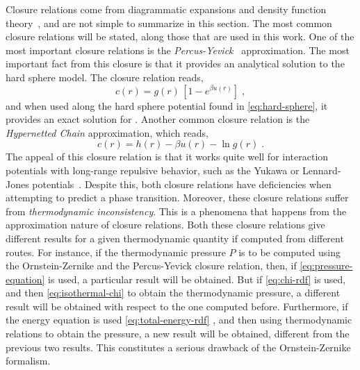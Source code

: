 Closure relations come from diagrammatic expansions and density function theory~\cite{hansenTheorySimpleLiquids2013},
and are not simple to summarize in this section. The most common closure relations will be
stated, along those that are used in this work. One of the most important closure relations
is the \emph{Percus-Yevick}~\cite{percusAnalysisClassicalStatistical1958} approximation.
The most important fact from this closure is that it provides an analytical solution to the 
hard sphere model. The closure relation reads,
\begin{equation}
    c(r) = g(r) \, \left[1 - e^{\beta u(r)}\right]
    \; ,
    \label{eq:py-cr}
\end{equation}
and when used along the hard sphere potential found in \autoref{eq:hard-sphere}, it provides
an exact solution for \rdf.
Another common closure relation is the \emph{Hypernetted Chain} approximation, which reads,
\begin{equation}
    c(r) = h(r) - \beta u(r) - \ln{g(r)} \; .
    \label{eq:hnc-cr}
\end{equation}
The appeal of this closure relation is that it works quite well for interaction potentials 
with long-range repulsive behavior, such as the Yukawa or Lennard-Jones potentials~\cite{hansenTheorySimpleLiquids2013}.
Despite this, both closure relations have deficiencies when attempting to predict a
phase transition. Moreover, these closure relations suffer from
\emph{thermodynamic inconsistency}. This is a phenomena that happens from the approximation
nature of closure relations. Both these closure relations give different results for
a given thermodynamic quantity if computed from different routes. For instance, if the 
thermodynamic pressure $P$ is to be computed using the Ornstein-Zernike and the 
Percus-Yevick closure relation, then, if \autoref{eq:pressure-equation} is used, a 
particular result will be obtained.
But if \autoref{eq:chi-rdf} is used, and then \autoref{eq:isothermal-chi} to obtain the 
thermodynamic pressure, a different result will be obtained with respect to the one
computed before. Furthermore, if the energy equation is used
\textemdash \autoref{eq:total-energy-rdf} \textemdash, 
and then using thermodynamic relations to obtain the pressure, a new result will be 
obtained, different from the previous two results. This constitutes a serious drawback of
the Ornstein-Zernike formalism.

